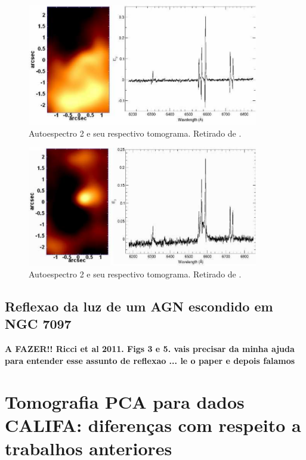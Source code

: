 \begin{figure}
    \includegraphics[width=0.9\textwidth]{figuras/figSteiner2009figA2.pdf}
    \caption[Tomograma e autoespectro 2 da galáxia NGC 4736.]
    {Autoespectro 2 e seu respectivo tomograma. Retirado de \citet[][fig.
    A2]{Steiner2009}.}
    \label{fig:TomoPCA:eigspec2}
\end{figure}

\begin{figure}
    \includegraphics[width=0.9\textwidth]{figuras/figSteiner2009figA3.pdf}
    \caption[Tomograma e autoespectro 3 da galáxia NGC 4736.]
    {Autoespectro 2 e seu respectivo tomograma. Retirado de \citet[][fig.
    A3]{Steiner2009}.}
    \label{fig:TomoPCA:eigspec3}
\end{figure}


\subsection{Reflexao da luz de um AGN escondido em NGC 7097}

{\bf\ojo A FAZER!! \ojo Ricci et al 2011. Figs 3 e 5. vais precisar da minha ajuda para entender esse assunto de reflexao ... le o paper e depois falamos}




\section{Tomografia PCA para dados CALIFA: diferenças com respeito a trabalhos anteriores}

